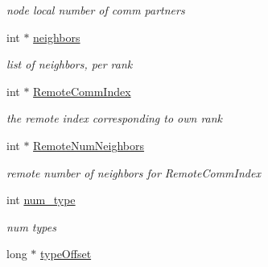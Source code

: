 \begin{DoxyCompactItemize}
\begin{DoxyCompactList}\small\item\em node local number of comm partners \end{DoxyCompactList}\item 
int $\ast$ \hyperlink{structshan__neighborhood__t_ada9cf12a5dda7681042224a9451134dd}{neighbors}\hypertarget{structshan__neighborhood__t_ada9cf12a5dda7681042224a9451134dd}{}\label{structshan__neighborhood__t_ada9cf12a5dda7681042224a9451134dd}

\begin{DoxyCompactList}\small\item\em list of neighbors, per rank \end{DoxyCompactList}\item 
int $\ast$ \hyperlink{structshan__neighborhood__t_a598f50b99c0c43e6185f2768e6d26d20}{Remote\+Comm\+Index}\hypertarget{structshan__neighborhood__t_a598f50b99c0c43e6185f2768e6d26d20}{}\label{structshan__neighborhood__t_a598f50b99c0c43e6185f2768e6d26d20}

\begin{DoxyCompactList}\small\item\em the remote index corresponding to own rank \end{DoxyCompactList}\item 
int $\ast$ \hyperlink{structshan__neighborhood__t_a7f242a84be34d7098136a4e29e461258}{Remote\+Num\+Neighbors}\hypertarget{structshan__neighborhood__t_a7f242a84be34d7098136a4e29e461258}{}\label{structshan__neighborhood__t_a7f242a84be34d7098136a4e29e461258}

\begin{DoxyCompactList}\small\item\em remote number of neighbors for Remote\+Comm\+Index \end{DoxyCompactList}\item 
int \hyperlink{structshan__neighborhood__t_af69002e058000abbcbebab83632eadff}{num\+\_\+type}\hypertarget{structshan__neighborhood__t_af69002e058000abbcbebab83632eadff}{}\label{structshan__neighborhood__t_af69002e058000abbcbebab83632eadff}

\begin{DoxyCompactList}\small\item\em num types \end{DoxyCompactList}\item 
long $\ast$ \hyperlink{structshan__neighborhood__t_aff6024d0240bae9fcda7c7810706e2cc}{type\+Offset}\hypertarget{structshan__neighborhood__t_aff6024d0240bae9fcda7c7810706e2cc}{}\label{structshan__neighborhood__t_aff6024d0240bae9fcda7c7810706e2cc}


\end{DoxyCompactItemize}
